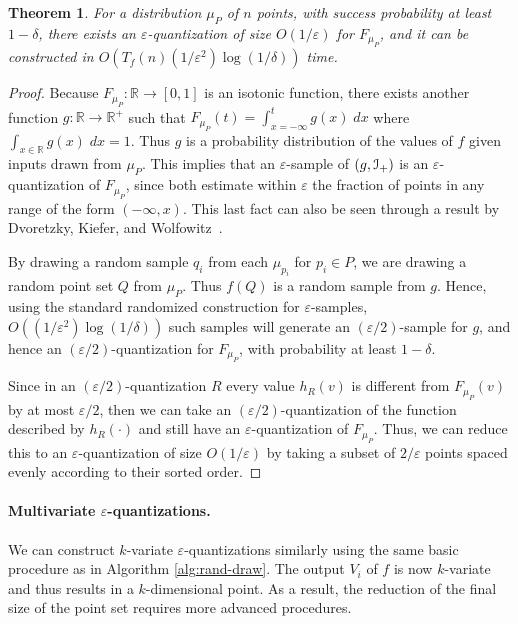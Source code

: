 \documentclass{journal}
\newcommand{\eps}{\varepsilon}
\newcommand{\Eu}[1]{\ensuremath{\EuScript{#1}}}
\newcommand{\R}{\ensuremath{\mathbb{R}}}
\newtheorem {theorem}{Theorem}[section]
\begin{document}
\begin{theorem}
For a distribution $\mu_P$ of $n$ points, with success probability at least $1-\delta$,
there exists an $\eps$-quantization of size $O(1/\eps)$ for $F_{\mu_P}$, and it can be constructed in $O(T_f(n) (1/\eps^2) \log (1/\delta))$ time.
\label{thm:eq-main}
\end{theorem}
\begin{proof}
Because $F_{\mu_P} : \R \to [0,1]$ is an isotonic function, there exists another function $g: \R \to \R^+$ such that $F_{\mu_P}(t) = \int_{x = -\infty}^t g(x) \; dx$ where $\int_{x \in \R} g(x) \;dx = 1$.  Thus $g$ is a probability distribution of the values of $f$ given inputs drawn from $\mu_P$.
This implies that an $\eps$-sample of $(g, \Eu{I}_+)$ is an $\eps$-quantization of $F_{\mu_P}$, since both estimate within $\eps$ the fraction of points in any range of the form $(-\infty, x)$.  This last fact can also be seen through a result by Dvoretzky, Kiefer, and Wolfowitz~\cite{DKW56}.  

By drawing a random sample $q_i$ from each $\mu_{p_i}$ for $p_i \in P$, we are drawing a random point set $Q$ from $\mu_P$.  Thus $f(Q)$ is a random sample from $g$.  Hence, using the standard randomized construction for $\eps$-samples, $O((1/\eps^2) \log (1/\delta))$ such samples will generate an $(\eps/2)$-sample for $g$, and hence an $(\eps/2)$-quantization for $F_{\mu_P}$, with probability at least $1-\delta$.

Since in an $(\eps/2)$-quantization $R$ every value $h_R(v)$ is different from $F_{\mu_P}(v)$ by at most $\eps/2$, then we can take an $(\eps/2)$-quantization of the function described by $h_R(\cdot)$ and still have an $\eps$-quantization of $F_{\mu_P}$.
Thus, we can reduce this to an $\eps$-quantization of size $O(1/\eps)$ by taking a subset of $2/\eps$ points spaced evenly according to their sorted order.
\end{proof}

\paragraph{Multivariate $\eps$-quantizations.}
We can construct $k$-variate $\eps$-quantizations similarly using the same basic procedure as in Algorithm \ref{alg:rand-draw}.
The output $V_i$ of $f$ is now $k$-variate and thus results in a $k$-dimensional point.
As a result, the reduction of the final size of the point set requires more advanced procedures.
\end{document}
